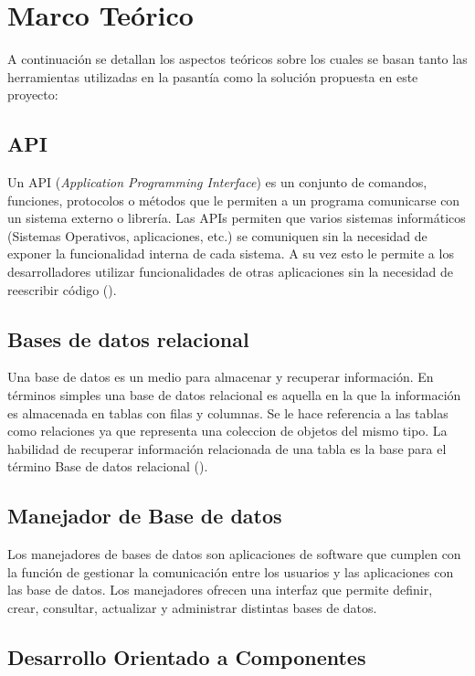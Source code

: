 \chapter{Marco Teórico}
\label{capitulo2}

A continuación se detallan los aspectos teóricos sobre los cuales se basan
tanto las herramientas utilizadas en la pasantía como la solución propuesta
en este proyecto:

\section{API}
Un API (\emph{Application Programming Interface}) es un conjunto de comandos,
funciones, protocolos o métodos que le permiten a un programa comunicarse
con un sistema externo o librería. Las APIs permiten que varios sistemas
informáticos (Sistemas Operativos, aplicaciones, etc.) se comuniquen sin la
necesidad de exponer la funcionalidad interna de cada sistema. A su vez esto
le permite a los desarrolladores utilizar funcionalidades de otras aplicaciones
sin la necesidad de reescribir código (\cite{API}).

\section{Bases de datos relacional}

Una base de datos es un medio para almacenar y recuperar información. En términos simples
una base de datos relacional es aquella en la que la información es almacenada en tablas con
filas y columnas. Se le hace referencia a las tablas como relaciones ya que representa una
coleccion de objetos del mismo tipo. La habilidad de recuperar información relacionada de una
tabla es la base para el término Base de datos relacional (\cite{RELACIONAL}).

\section{Manejador de Base de datos}
Los manejadores de bases de datos son aplicaciones de software que cumplen con la función
de gestionar la comunicación entre los usuarios y las aplicaciones con las base de datos.
Los manejadores ofrecen una interfaz que permite definir, crear, consultar, actualizar
y administrar distintas bases de datos.

\section{Desarrollo Orientado a Componentes}

